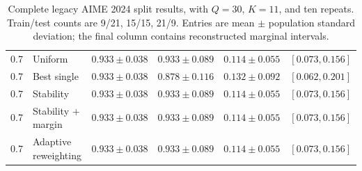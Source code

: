\begin{table}[p]
\begin{tabular}{clcccc}
0.7 & Uniform & \(0.933\mathbin{\pm}0.038\) & \(0.933\mathbin{\pm}0.089\) & \(0.114\mathbin{\pm}0.055\) & \([0.073,0.156]\) \\
0.7 & Best single & \(0.933\mathbin{\pm}0.038\) & \(0.878\mathbin{\pm}0.116\) & \(0.132\mathbin{\pm}0.092\) & \([0.062,0.201]\) \\
0.7 & Stability & \(0.933\mathbin{\pm}0.038\) & \(0.933\mathbin{\pm}0.089\) & \(0.114\mathbin{\pm}0.055\) & \([0.073,0.156]\) \\
0.7 & Stability \(+\) margin & \(0.933\mathbin{\pm}0.038\) & \(0.933\mathbin{\pm}0.089\) & \(0.114\mathbin{\pm}0.055\) & \([0.073,0.156]\) \\
0.7 & Adaptive reweighting & \(0.933\mathbin{\pm}0.038\) & \(0.933\mathbin{\pm}0.089\) & \(0.114\mathbin{\pm}0.055\) & \([0.073,0.156]\) \\
\bottomrule
\end{tabular}
\caption{Complete legacy AIME 2024 split results, with \(Q=30\), \(K=11\), and ten repeats.  Train/test counts are 9/21, 15/15, 21/9.  Entries are mean \(\mathbin{\pm}\) population standard deviation; the final column contains reconstructed marginal intervals.}
\label{tab:legacy-full-aime2024}
\end{table}

